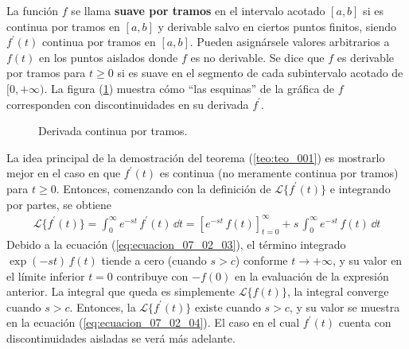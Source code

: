 La función $f$ se llama \textbf{suave por tramos} en el intervalo acotado $[a, b]$ si es continua por tramos en $[a, b]$ y derivable salvo en ciertos puntos finitos, siendo $f^{\prime}(t)$ continua por tramos en $[a, b]$. Pueden asignársele valores arbitrarios a $f(t)$ en los puntos aislados donde $f$ es no derivable. Se dice que $f$ es derivable por tramos para $t \geq 0$ si es suave en el segmento de cada subintervalo acotado de $[0, +\infty)$. La figura (\ref{fig:figura_07_02_01}) muestra cómo \enquote{las esquinas} de la gráfica de $f$ corresponden con discontinuidades en su derivada $f^{\prime}$.
\begin{figure}[!ht]
    \centering
    
    \caption{Derivada continua por tramos.}
    \label{fig:figura_07_02_01}
\end{figure}
La idea principal de la demostración del teorema (\ref{teo:teo_001}) es mostrarlo mejor en el caso en que $f^{\prime}(t)$ es continua (no meramente continua por tramos) para $t \geq 0$. Entonces, comenzando con la definición de $\mathscr{L} \{ f^{\prime}(t) \} $ e integrando por partes, se obtiene
\begin{align*}
\mathscr{L} \{f^{\prime}(t) \} = \int_{0}^{\infty} e^{-st} \, f^{\prime}(t) \, \dd t = \left[ e^{-st} \, f(t) \right]_{t=0}^{\infty} + s \, \int_{0}^{\infty} e^{-st} \, f(t) \, \dd{t}
\end{align*}
Debido a la ecuación (\ref{eq:ecuacion_07_02_03}), el término integrado $\exp(-st) \, f(t)$ tiende a cero (cuando $s > c$) conforme $t \to +\infty$, y su valor en el límite inferior $t=0$ contribuye con $-f(0)$ en la evaluación de la expresión anterior. La integral que queda es simplemente $\mathscr{L} \{ f(t) \} $, la integral converge cuando $s > c$. Entonces, la $\mathscr{L} \{ f^{\prime}(t) \}$ existe cuando $s > c$, y su valor se muestra en la ecuación (\ref{eq:ecuacion_07_02_04}). El caso en el cual $f^{\prime}(t)$ cuenta con discontinuidades aisladas se verá más adelante.
